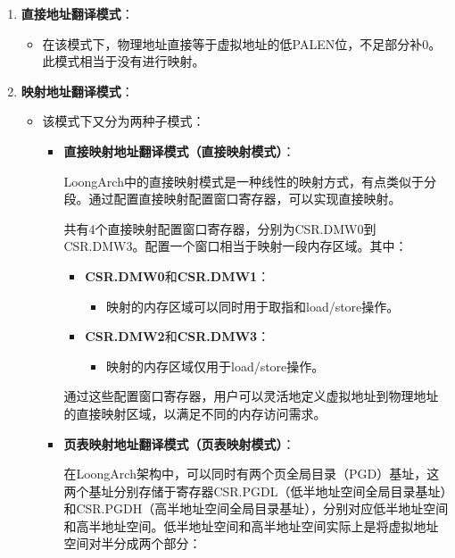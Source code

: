 \begin{enumerate}
\def\labelenumi{\arabic{enumi}.}
\item
  \textbf{直接地址翻译模式}：

  \begin{itemize}
  \tightlist
  \item
    在该模式下，物理地址直接等于虚拟地址的低PALEN位，不足部分补0。此模式相当于没有进行映射。
  \end{itemize}
\item
  \textbf{映射地址翻译模式}：

  \begin{itemize}
  \tightlist
  \item
    该模式下又分为两种子模式：

    \begin{itemize}
    \item
      \textbf{直接映射地址翻译模式（直接映射模式）}：

      LoongArch中的直接映射模式是一种线性的映射方式，有点类似于分段。通过配置直接映射配置窗口寄存器，可以实现直接映射。

      共有4个直接映射配置窗口寄存器，分别为CSR.DMW0到CSR.DMW3。配置一个窗口相当于映射一段内存区域。其中：

      \begin{itemize}
      \tightlist
      \item
        \textbf{CSR.DMW0}和\textbf{CSR.DMW1}：

        \begin{itemize}
        \tightlist
        \item
          映射的内存区域可以同时用于取指和load/store操作。
        \end{itemize}
      \item
        \textbf{CSR.DMW2}和\textbf{CSR.DMW3}：

        \begin{itemize}
        \tightlist
        \item
          映射的内存区域仅用于load/store操作。
        \end{itemize}
      \end{itemize}

      通过这些配置窗口寄存器，用户可以灵活地定义虚拟地址到物理地址的直接映射区域，以满足不同的内存访问需求。
    \item
      \textbf{页表映射地址翻译模式（页表映射模式）}：

      在LoongArch架构中，可以同时有两个页全局目录（PGD）基址，这两个基址分别存储于寄存器CSR.PGDL（低半地址空间全局目录基址）和CSR.PGDH（高半地址空间全局目录基址），分别对应低半地址空间和高半地址空间。低半地址空间和高半地址空间实际上是将虚拟地址空间对半分成两个部分：


\end{itemize}
\end{itemize}
\end{enumerate}
